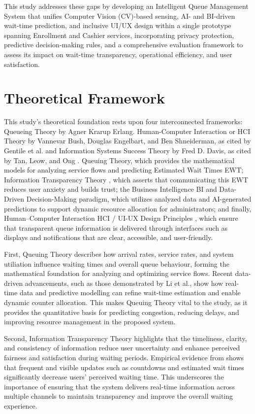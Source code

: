 \documentclass{research}
\begin{document}
This study addresses these gaps by developing an Intelligent Queue Management System that unifies Computer Vision (CV)-based sensing, AI- and BI-driven wait-time prediction, and inclusive UI/UX design within a single prototype spanning Enrollment and Cashier services, incorporating privacy protection, predictive decision-making rules, and a comprehensive evaluation framework to assess its impact on wait-time transparency, operational efficiency, and user satisfaction.

\section{Theoretical Framework}
This study's theoretical foundation rests upon four interconnected frameworks: Queueing Theory by Agner Krarup Erlang. Human-Computer Interaction or HCI Theory by Vannevar Bush, Douglas Engelbart, and Ben Shneiderman, as cited by Gentile et al. \cite{ref70} and Information Systems Success Theory by Fred D. Davis, as cited by Tan, Leow, and Ong \cite{ref73}.
Queuing Theory, which provides the mathematical models for analyzing service flows and predicting Estimated Wait Times EWT; Information Transparency Theory \cite{ref71}, which asserts that communicating this EWT reduces user anxiety and builds trust; the Business Intelligence BI and Data-Driven Decision-Making paradigm, which utilizes analyzed data and AI-generated predictions to support dynamic resource allocation for administrators; and finally, Human–Computer Interaction HCI / UI-UX Design Principles \cite{ref70}, which ensure that transparent queue information is delivered through interfaces such as displays and notifications that are clear, accessible, and user-friendly.

First, Queuing Theory describes how arrival rates, service rates, and system utiliation influence waiting times and overall queue behaviour, forming the mathematical foundation for analyzing and optimizing service flows. Recent data-driven advancements, such as those demonstrated by Li et al., show how real-time data and predictive modelling can refine wait-time estimation and enable dynamic counter allocation. This makes Queuing Theory vital to the study, as it provides the quantitative basis for predicting congestion, reducing delays, and improving resource management in the proposed system.

Second, Information Transparency Theory highlights that the timeliness, clarity, and consistency of information reduce user uncertainty and enhance perceived fairness and satisfaction during waiting periods. Empirical evidence from \cite{ref71} shows that frequent and visible updates such as countdowns and estimated wait times significantly decrease users’ perceived waiting time. This underscores the importance of ensuring that the system delivers real-time information across multiple channels to maintain transparency and improve the overall waiting experience.
\end{document}
